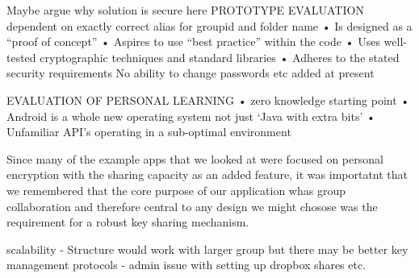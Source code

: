 Maybe argue why solution is secure here
PROTOTYPE EVALUATION
dependent on exactly correct alias for groupid and folder name
• Is designed as a “proof of concept”
• Aspires to use “best practice” within the code 
• Uses well-tested cryptographic techniques and standard libraries
• Adheres to the stated security requirements 
No ability to change passwords etc added at present

EVALUATION OF PERSONAL LEARNING 
• zero knowledge starting point 
• Android is a whole new operating system not just ‘Java with extra bits’
• Unfamiliar API’s operating in a sub-optimal environment 


Since many of the example apps that we looked at were focused on personal encryption with the sharing capacity as an added feature, it was importatnt that we remembered that the core purpose of our application whas group collaboration and therefore central to any design we might chosose was the requirement for a robust key sharing mechanism.

scalability - Structure would work with larger group but there may be better key management protocols - admin issue with setting up dropbox shares etc.

